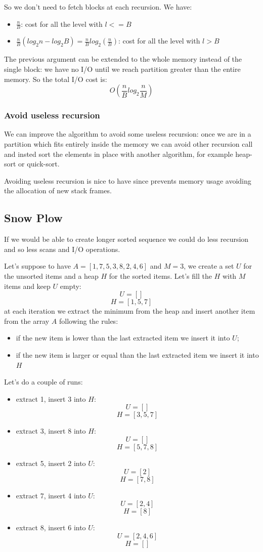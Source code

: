 So we don't need to fetch blocks at each recursion.
We have: 
\begin{itemize}
    \item $\frac{n}{B}$: cost for all the level with $l <= B$
    \item $\frac{n}{B} \left( log_2 n - log_2 B \right) = \frac{n}{B} log_2 \left( \frac{n}{B} \right)$: cost for all the level with $l > B$
\end{itemize}

The previous argument can be extended to the whole memory instead of the single block: we have no I/O until we reach partition greater than the entire memory.
So the total I/O cost is:
$$
    O\left( \frac{n}{B} log_2 \frac{n}{M} \right)
$$

\subsubsection{Avoid useless recursion}
We can improve the algorithm to avoid some useless recursion: once we are in a partition which fits entirely inside the memory we can avoid other recursion call and insted sort the elements in place with another algorithm, for example heap-sort or quick-sort.

Avoiding useless recursion is nice to have since prevents memory usage avoiding the allocation of new stack frames.

\subsection{Snow Plow}
If we would be able to create longer sorted sequence we could do less recursion and so less scans and I/O operations.

Let's suppose to have $A=[1, 7, 5, 3, 8, 2, 4, 6]$ and $M=3$, we create a set $U$ for the unsorted items and a heap $H$ for the sorted items.
Let's fill the $H$ with $M$ items and keep $U$ empty:
$$ U = [] $$
$$ H = [1, 5, 7] $$
at each iteration we extract the minimum from the heap and insert another item from the array $A$ following the rules:
\begin{itemize}
    \item if the new item is lower than the last extracted item we insert it into $U$;
    \item if the new item is larger or equal than the last extracted item we insert it into $H$
\end{itemize}
Let's do a couple of runs: 
\begin{itemize}
    \item extract 1, insert 3 into $H$:
        $$ U = [] $$
        $$ H = [3, 5, 7] $$
    \item extract 3, insert 8 into $H$:
        $$ U = [] $$
        $$ H = [5, 7, 8] $$
    \item extract 5, insert 2 into $U$:
        $$ U = [2] $$
        $$ H = [7, 8] $$
    \item extract 7, insert 4 into $U$:
        $$ U = [2, 4] $$
        $$ H = [8] $$
    \item extract 8, insert 6 into $U$:
        $$ U = [2, 4, 6] $$
        $$ H = [] $$
\end{itemize}

